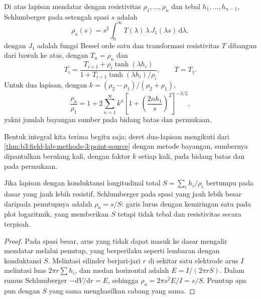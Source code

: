 \begin{proposition}\label{prop:b3:field-lab-methods-3:layers}
Di atas lapisan mendatar dengan resistivitas $\rho_1, \dots, \rho_n$ dan
tebal $h_1, \dots, h_{n-1}$,  Schlumberger
pada setengah spasi $s$ adalah
\[
\rho_a(s) = s^2\int_0^\infty T(\lambda)\,\lambda\,J_1(\lambda s)\,\mathrm{d}\lambda ,
\]
dengan $J_1$ adalah fungsi Bessel orde satu dan transformasi resistivitas
$T$ dibangun dari bawah ke atas, dengan $T_n = \rho_n$ dan
\[
T_i = \frac{T_{i+1} + \rho_i\tanh(\lambda h_i)}{1 + T_{i+1}\tanh(\lambda h_i)/\rho_i} ,
\qquad T = T_1 .
\]
Untuk dua lapisan, dengan $k = (\rho_2 - \rho_1)/(\rho_2 + \rho_1)$,
\[
\frac{\rho_a}{\rho_1} = 1 + 2\sum_{n=1}^{\infty} k^n
  \left[1 + \left(\frac{2nh_1}{s}\right)^2\right]^{-3/2} ,
\]
yakni jumlah bayangan sumber pada bidang batas dan permukaan.
\end{proposition}
Bentuk integral kita terima begitu saja; deret dua-lapisan mengikuti dari
\cref{thm:b3:field-lab-methods-3:point-source} dengan metode bayangan,
sumbernya dipantulkan berulang kali, dengan faktor $k$ setiap
kali, pada bidang batas dan pada permukaan.

\begin{proposition}\label{prop:b3:field-lab-methods-3:conductance}
Jika lapisan dengan konduktansi longitudinal total $S = \sum_i h_i/\rho_i$ bertumpu
pada dasar yang jauh lebih resistif,  Schlumberger pada
spasi yang jauh lebih besar daripada penutupnya adalah $\rho_a = s/S$: garis lurus
dengan kemiringan satu pada plot logaritmik, yang memberikan $S$ tetapi tidak
tebal dan resistivitas secara terpisah.
\end{proposition}

\begin{proof}
Pada spasi besar, arus yang tidak dapat masuk ke dasar mengalir
mendatar melalui penutup, yang berperilaku seperti lembaran dengan
konduktansi $S$. Melintasi silinder berjari-jari $r$ di sekitar satu elektrode
arus $I$ melintasi luas $2\pi r\sum h_i$, dan medan horizontal
adalah $E = I/(2\pi rS)$. Dalam rumus Schlumberger $-\mathrm{d}V/
\mathrm{d}r = E$, sehingga $\rho_a = 2\pi s^2 E/I = s/S$. Penutup apa pun dengan
$S$ yang sama menghasilkan cabang yang sama.
\end{proof}


